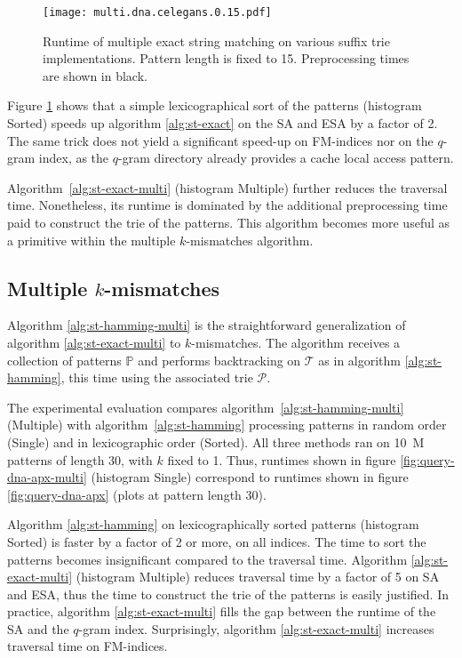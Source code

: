 \begin{figure}[b]
\begin{center}
\caption[Multiple exact string matching runtime]{Runtime of multiple exact string matching on various suffix trie implementations. Pattern length is fixed to 15. Preprocessing times are shown in black.}
\label{fig:query-dna-exact-multi}
\texttt{[image: multi.dna.celegans.0.15.pdf]}
\end{center}
\end{figure}

Figure \ref{fig:query-dna-exact-multi} shows that a simple lexicographical sort of the patterns (histogram Sorted) speeds up algorithm \ref{alg:st-exact} on the SA and ESA by a factor of 2.
The same trick does not yield a significant speed-up on FM-indices nor on the $q$-gram index, as the $q$-gram directory already provides a cache local access pattern.

Algorithm~\ref{alg:st-exact-multi} (histogram Multiple) further reduces the traversal time.
Nonetheless, its runtime is dominated by the additional preprocessing time paid to construct the trie of the patterns.
This algorithm becomes more useful as a primitive within the multiple $k$-mismatches algorithm.

\subsection{Multiple $k$-mismatches}
\label{sec:index:algo:multimismatch}

Algorithm \ref{alg:st-hamming-multi} is the straightforward generalization of algorithm \ref{alg:st-exact-multi} to $k$-mismatches.
The algorithm receives a collection of patterns $\mathbb{P}$ and performs backtracking on $\mathcal{T}$ as in algorithm  \ref{alg:st-hamming}, this time using the associated trie $\mathcal{P}$.

The experimental evaluation compares algorithm~\ref{alg:st-hamming-multi} (Multiple) with algorithm~\ref{alg:st-hamming} processing patterns in random order (Single) and in lexicographic order (Sorted).
All three methods ran on 10~M patterns of length 30, with $k$ fixed to 1.
Thus, runtimes shown in figure \ref{fig:query-dna-apx-multi} (histogram Single) correspond to runtimes shown in figure \ref{fig:query-dna-apx} (plots at pattern length 30).

Algorithm \ref{alg:st-hamming} on lexicographically sorted patterns (histogram Sorted) is faster by a factor of 2 or more, on all indices.
The time to sort the patterns becomes insignificant compared to the traversal time.
Algorithm \ref{alg:st-exact-multi} (histogram Multiple) reduces traversal time by a factor of 5 on SA and ESA, thus the time to construct the trie of the patterns is easily justified.
In practice, algorithm \ref{alg:st-exact-multi} fills the gap between the runtime of the SA and the $q$-gram index.
Surprisingly, algorithm \ref{alg:st-exact-multi} increases traversal time on FM-indices.

